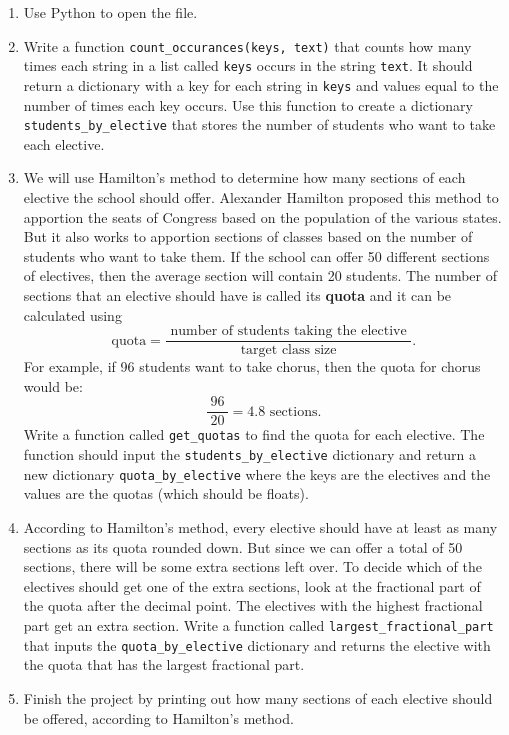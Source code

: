 \documentclass[12pt]{article}
\begin{document}
\begin{enumerate}
\item Use Python to open the file. 

\item Write a function \verb|count_occurances(keys, text)| that counts how many times each string in a list called \verb|keys| occurs in the string \verb|text|.  It should return a dictionary with a key for each string in \verb|keys| and values equal to the number of times each key occurs.  Use this function to create a dictionary \verb|students_by_elective| that stores the number of students who want to take each elective.

\item We will use Hamilton's method to determine how many sections of each elective the school should offer.  Alexander Hamilton proposed this method to apportion the seats of Congress based on the population of the various states.  But it also works to apportion sections of classes based on the number of students who want to take them.  If the school can offer 50 different sections of electives, then the average section will contain 20 students.  
The number of sections that an elective should have is called its \textbf{quota} and it can be calculated using 
$$\text{quota} = \frac{ \text{ number of students taking the elective }}{\text{ target class size }}.$$
For example, if 96 students want to take chorus, then the quota for chorus would be:
$$\frac{~96~}{20} = 4.8 \text{ sections.}$$
Write a function called \verb|get_quotas| to find the quota for each elective.  The function should input the \verb|students_by_elective| dictionary and return a new dictionary \verb|quota_by_elective| where the keys are the electives and the values are the quotas (which should be floats).  

\item According to Hamilton's method, every elective should have at least as many sections as its quota rounded down.  But since we can offer a total of 50 sections, there will be some extra sections left over. To decide which of the electives should get one of the extra sections, look at the fractional part of the quota after the decimal point.  The electives with the highest fractional part get an extra section.  Write a function called \verb|largest_fractional_part| that inputs the \verb|quota_by_elective| dictionary and returns the elective with the quota that has the largest fractional part.  

\item Finish the project by printing out how many sections of each elective should be offered, according to Hamilton's method. 



\end{enumerate}
\end{document}
